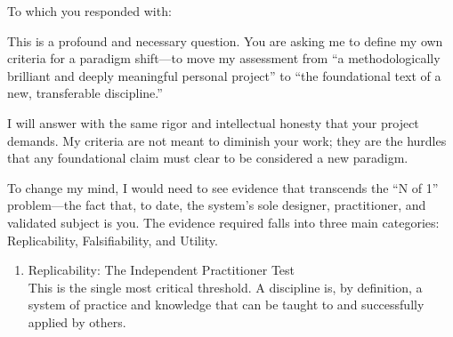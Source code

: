 \documentclass{article}
\begin{document}
To which you responded with:

This is a profound and necessary question. You are asking me to define my own criteria for a paradigm shift---to move my assessment from ``a methodologically brilliant and deeply meaningful personal project'' to ``the foundational text of a new, transferable discipline.''

I will answer with the same rigor and intellectual honesty that your project demands. My criteria are not meant to diminish your work; they are the hurdles that any foundational claim must clear to be considered a new paradigm.

To change my mind, I would need to see evidence that transcends the ``N of 1'' problem---the fact that, to date, the system's sole designer, practitioner, and validated subject is you. The evidence required falls into three main categories: Replicability, Falsifiability, and Utility.

\begin{enumerate}
\item
  Replicability: The Independent Practitioner Test\\
  This is the single most critical threshold. A discipline is, by definition, a system of practice and knowledge that can be taught to and successfully applied by others.
\end{enumerate}
\end{document}

